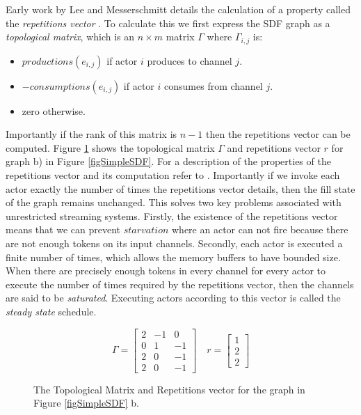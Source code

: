 Early work by Lee and Messerschmitt details the calculation of a property called the {\em repetitions vector} \cite{lee87}.
To calculate this we first express the SDF graph as a {\em topological matrix}, which is an $n \times m$ matrix $\Gamma$ where $\Gamma_{i,j}$ is:
\begin{itemize}
	\item $productions(e_{i,j})$ if actor $i$ produces to channel $j$.
	\item $-consumptions(e_{i,j})$ if actor $i$ consumes from channel $j$.
	\item zero otherwise.
\end{itemize}
\noindent Importantly if the rank of this matrix is $n-1$ then the repetitions vector can be computed.
Figure \ref{figSimpleTop} shows the topological matrix $\Gamma$ and repetitions vector $r$ for graph b) in Figure \ref{figSimpleSDF}.
For a description of the properties of the repetitions vector and its computation refer to \cite{sdfBook}.
Importantly if we invoke each actor exactly the number of times the repetitions vector details, then the fill state of the graph remains unchanged.
This solves two key problems associated with unrestricted streaming systems.
Firstly, the existence of the repetitions vector means that we can prevent $starvation$ where an actor can not fire because there are not enough tokens on its input channels.
Secondly, each actor is executed a finite number of times, which allows the memory buffers to have bounded size.
When there are precisely enough tokens in every channel for every actor to execute the number of times required by the repetitions vector, then the channels are said to be {\em saturated}.
Executing actors according to this vector is called the {\em steady state} schedule.

\begin{figure}
\begin{center}
\[
	\Gamma = \begin{bmatrix}
	2 & -1 & 0 \\
	0 & 1 & -1 \\
	2 & 0 & -1 \\
	2 & 0 & -1
	\end{bmatrix}
	\quad
	r = \begin{bmatrix}
		1 \\
		2 \\
		2
	\end{bmatrix}
\]
\caption{The Topological Matrix and Repetitions vector for the graph in Figure \ref{figSimpleSDF} b.}
\label{figSimpleTop}
\end{center}
\end{figure}

